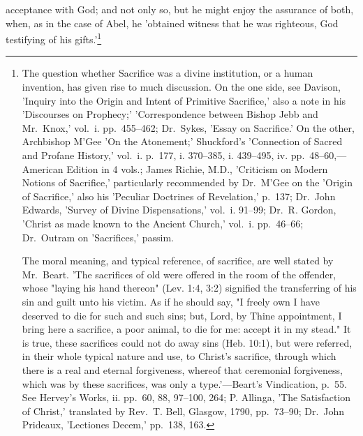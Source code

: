 \documentclass[
]{book}
\begin{document}
acceptance with God; and not only so, but he might enjoy the assurance of both, when, as in the case of Abel, he 'obtained witness that he was righteous, God testifying of his gifts.'\footnote{The question whether Sacrifice was a divine institution, or a human invention, has given rise to much discussion. On the one side, see Davison, 'Inquiry into the Origin and Intent of Primitive Sacrifice,' also a note in his 'Discourses on Prophecy;' 'Correspondence between Bishop Jebb and Mr.~Knox,' vol.~i. pp.~455--462; Dr.~Sykes, 'Essay on Sacrifice.' On the other, Archbishop M'Gee 'On the Atonement;' Shuckford's 'Connection of Sacred and Profane History,' vol.~i. p.~177, i. 370--385, i. 439--495, iv. pp.~48--60,---American Edition in 4 vols.; James Richie, M.D., 'Criticism on Modern Notions of Sacrifice,' particularly recommended by Dr.~M'Gee on the 'Origin of Sacrifice,' also his 'Peculiar Doctrines of Revelation,' p.~137; Dr.~John Edwards, 'Survey of Divine Dispensations,' vol.~i. 91--99; Dr.~R. Gordon, 'Christ as made known to the Ancient Church,' vol.~i. pp.~46--66; Dr.~Outram on 'Sacrifices,' passim.

  The moral meaning, and typical reference, of sacrifice, are well stated by Mr.~Beart. 'The sacrifices of old were offered in the room of the offender, whose "laying his hand thereon" (Lev. 1:4, 3:2) signified the transferring of his sin and guilt unto his victim. As if he should say, "I freely own I have deserved to die for such and such sins; but, Lord, by Thine appointment, I bring here a sacrifice, a poor animal, to die for me: accept it in my stead." It is true, these sacrifices could not do away sins (Heb. 10:1), but were referred, in their whole typical nature and use, to Christ's sacrifice, through which there is a real and eternal forgiveness, whereof that ceremonial forgiveness, which was by these sacrifices, was only a type.'---Beart's Vindication, p.~55. See Hervey's Works, ii. pp.~60, 88, 97--100, 264; P. Allinga, 'The Satisfaction of Christ,' translated by Rev.~T. Bell, Glasgow, 1790, pp.~73--90; Dr.~John Prideaux, 'Lectiones Decem,' pp.~138, 163.}
\end{document}
